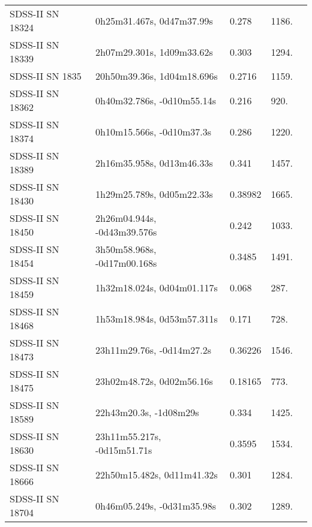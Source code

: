 \begin{longtable}{lllll}
 SDSS-II SN 18324 &      0h25m31.467s, 0d47m37.99s &    0.278 &          1186. &    \citet{2010ApJ...713.1026D} \\
 SDSS-II SN 18339 &      2h07m29.301s, 1d09m33.62s &    0.303 &          1294. &    \citet{2010ApJ...713.1026D} \\
  SDSS-II SN 1835 &     20h50m39.36s, 1d04m18.696s &   0.2716 &          1159. &    \citet{2011ApJ...738..162S} \\
 SDSS-II SN 18362 &     0h40m32.786s, -0d10m55.14s &    0.216 &           920. &    \citet{2011ApJ...738..162S} \\
 SDSS-II SN 18374 &      0h10m15.566s, -0d10m37.3s &    0.286 &          1220. &    \citet{2011ApJ...738..162S} \\
 SDSS-II SN 18389 &      2h16m35.958s, 0d13m46.33s &    0.341 &          1457. &    \citet{2011ApJ...738..162S} \\
 SDSS-II SN 18430 &      1h29m25.789s, 0d05m22.33s &  0.38982 &          1665. &    \citet{2016SDSSD.C...0000:} \\
 SDSS-II SN 18450 &    2h26m04.944s, -0d43m39.576s &    0.242 &          1033. &    \citet{2011ApJ...738..162S} \\
 SDSS-II SN 18454 &    3h50m58.968s, -0d17m00.168s &   0.3485 &          1491. &    \citet{2011ApJ...738..162S} \\
 SDSS-II SN 18459 &     1h32m18.024s, 0d04m01.117s &    0.068 &           287. &    \citet{2011ApJ...738..162S} \\
 SDSS-II SN 18468 &     1h53m18.984s, 0d53m57.311s &    0.171 &           728. &    \citet{2011ApJ...738..162S} \\
 SDSS-II SN 18473 &      23h11m29.76s, -0d14m27.2s &  0.36226 &          1546. &    \citet{2016SDSSD.C...0000:} \\
 SDSS-II SN 18475 &      23h02m48.72s, 0d02m56.16s &  0.18165 &           773. &    \citet{2016SDSSD.C...0000:} \\
 SDSS-II SN 18589 &         22h43m20.3s, -1d08m29s &    0.334 &          1425. &    \citet{2010ApJ...713.1026D} \\
 SDSS-II SN 18630 &    23h11m55.217s, -0d15m51.71s &   0.3595 &          1534. &    \citet{2011ApJ...738..162S} \\
 SDSS-II SN 18666 &     22h50m15.482s, 0d11m41.32s &    0.301 &          1284. &    \citet{2010ApJ...713.1026D} \\
 SDSS-II SN 18704 &     0h46m05.249s, -0d31m35.98s &    0.302 &          1289. &    \citet{2010ApJ...713.1026D} \\

\end{longtable}
